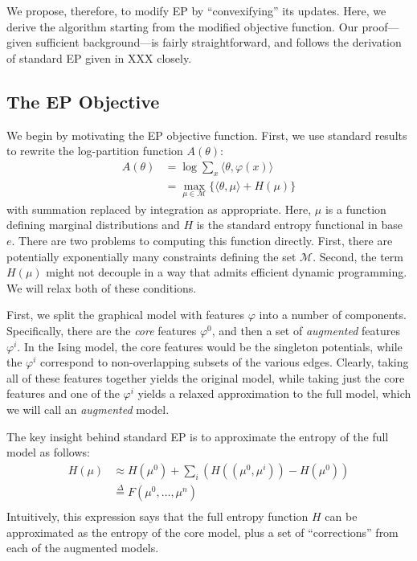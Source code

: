 \documentclass[times, 10pt,twocolumn]{article}
\begin{document}
We propose, therefore, to modify EP by ``convexifying'' its updates.
Here, we derive the algorithm starting from the modified objective
function. Our proof---given sufficient background---is fairly
straightforward, and follows the derivation of standard EP given in
XXX closely.

\subsection{The EP Objective}

We begin by motivating the EP objective function. First, we use standard results to rewrite the log-partition
function $A(\theta)$:
\begin{equation}
  \begin{split}
     A(\theta) &= \log \sum_x \langle\theta,\varphi(x)\rangle\\
     &= \max_{\mu \in \mathcal{M}} \{ \langle\theta,\mu\rangle + H(\mu) \}
   \end{split}
 \end{equation}
with summation replaced by integration as appropriate. Here, $\mu$
is a function defining marginal distributions and $H$ is the standard
entropy functional in base $e$. There are two problems to computing
this function directly. First, there are potentially exponentially
many constraints defining the set $\mathcal M$. Second, the term
$H(\mu)$ might not decouple in a way that admits efficient dynamic
programming. We will relax both of these conditions.

First, we split the graphical model with features $\varphi$ into
a number of components. Specifically, there are the \textit{core}
features $\varphi^0$, and then a set of \textit{augmented}
features $\varphi^i$. In the Ising model, the core features would
be the singleton potentials, while the $\varphi^i$ correspond to
non-overlapping subsets of the various edges. Clearly, taking all
of these features together yields the original model, while taking
just the core features and one of the $\varphi^i$ yields 
a relaxed approximation to the full model, which we will call an
\textit{augmented} model.

The key insight behind standard EP is to approximate the entropy of
the full model as follows:
\begin{equation}
  \begin{split}
     H(\mu) &\approx H(\mu^0) + \sum_i \left ( H( (\mu^0,\mu^i)) -
     H(\mu^0)\right) \\
     & \stackrel{\Delta}= F(\mu^0, \ldots, \mu^n) \\
     \label{eqn:epentropy}
   \end{split}
 \end{equation}
Intuitively, this expression says that the full entropy function
$H$ can be approximated as the entropy of the core model, plus
a set of ``corrections'' from each of the augmented models.
\end{document}
